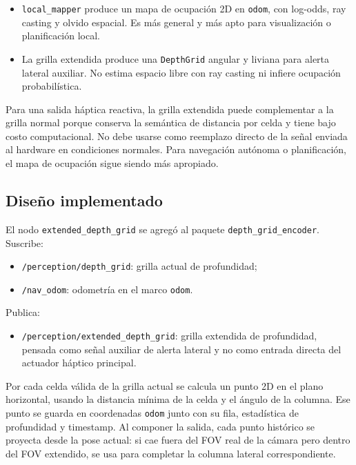 \begin{itemize}
  \item \texttt{local\_mapper} produce un mapa de ocupación 2D en \texttt{odom}, con
  log-odds, ray casting y olvido espacial. Es más general y más apto para visualización o
  planificación local.

  \item La grilla extendida produce una \texttt{DepthGrid} angular y liviana para alerta
  lateral auxiliar. No estima espacio libre con ray casting ni infiere ocupación
  probabilística.
\end{itemize}

Para una salida háptica reactiva, la grilla extendida puede complementar a la grilla normal
porque conserva la semántica de distancia por celda y tiene bajo costo computacional. No debe
usarse como reemplazo directo de la señal enviada al hardware en condiciones normales. Para
navegación autónoma o planificación, el mapa de ocupación sigue siendo más apropiado.

\subsection{Diseño implementado}

El nodo \texttt{extended\_depth\_grid} se agregó al paquete \texttt{depth\_grid\_encoder}.
Suscribe:

\begin{itemize}
  \item \texttt{/perception/depth\_grid}: grilla actual de profundidad;
  \item \texttt{/nav\_odom}: odometría en el marco \texttt{odom}.
\end{itemize}

Publica:

\begin{itemize}
  \item \texttt{/perception/extended\_depth\_grid}: grilla extendida de profundidad,
  pensada como señal auxiliar de alerta lateral y no como entrada directa del actuador
  háptico principal.
\end{itemize}

Por cada celda válida de la grilla actual se calcula un punto 2D en el plano horizontal,
usando la distancia mínima de la celda y el ángulo de la columna. Ese punto se guarda en
coordenadas \texttt{odom} junto con su fila, estadística de profundidad y timestamp. Al
componer la salida, cada punto histórico se proyecta desde la pose actual: si cae fuera del
FOV real de la cámara pero dentro del FOV extendido, se usa para completar la columna lateral
correspondiente.


